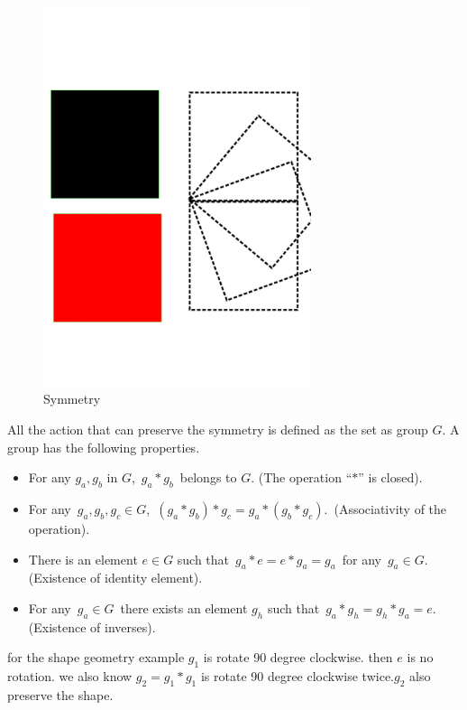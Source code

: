 \begin{figure}[!htbp]
  \begin{center}
      \includegraphics[width=0.7\textwidth]{Symmetry}
    \caption{Symmetry}
    \label{fig:symmetry}
\end{center}
\end{figure}


All the action that can preserve the symmetry is defined as the set as group $G$.
A group has the following properties.
\begin{itemize}
\item For any $g_a,g_b$ in $G$, \,$g_a*g_b$\, belongs to $G$. (The operation
``$*$'' is closed).

\item For any \,$g_a,g_b,g_c\in G$, \,$(g_a*g_b)*g_c=g_a*(g_b*g_c)$. \,(Associativity of
the operation).

\item There is an element $e\in G$ such that \,$g_a*e=e*g_a=g_a$\, for any
\,$g_a\in G$. (Existence of identity element).

\item For any \,$g_a\in G$\, there exists an element $g_h$ such that
\,$g_a*g_h=g_h*g_a=e$. \,(Existence of inverses).
\end{itemize}

for the shape geometry example $g_1$ is rotate 90 degree clockwise. then $e$ is no rotation.
we also know $g_2=g_1*g_1$ is rotate 90 degree clockwise twice.$g_2$ also preserve the shape.



